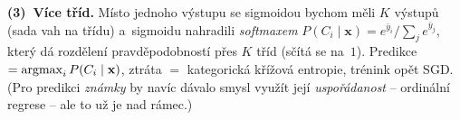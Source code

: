 \begin{priklad}
\textbf{(3)~Více tříd.} Místo jednoho výstupu se sigmoidou bychom měli $K$ výstupů (sada vah na třídu) a~sigmoidu nahradili \emph{softmaxem} $P(C_i\mid\mathbf{x})=e^{\bar y_i}/\sum_j e^{\bar y_j}$, který dá rozdělení pravděpodobností přes $K$ tříd (sčítá se na~$1$). Predikce $=\operatorname*{argmax}_i P(C_i\mid\mathbf{x})$, ztráta $=$ kategorická křížová entropie, trénink opět SGD. (Pro predikci \emph{známky} by navíc dávalo smysl využít její \emph{uspořádanost} -- ordinální regrese -- ale to už je nad rámec.)
\end{priklad}
